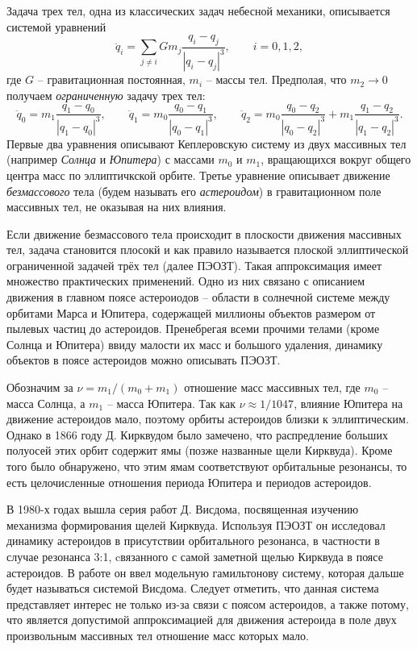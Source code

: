 Задача трех тел, одна из классических задач небесной механики, описывается системой уравнений
$$\ddot q_i = \sum_{j \neq i} G m_j \frac{q_i-q_j}{|q_i-q_j|^3}, \qquad i = 0,1,2,$$
где $G$ -- гравитационная постоянная, $m_i$ -- массы тел.
Предполая, что $m_2 \to 0$ получаем \textit{ограниченную} задачу трех тел:
$$\ddot q_0 = m_1 \frac{q_1-q_0}{|q_1-q_0|^3}, \qquad \ddot q_1 = m_0 \frac{q_0-q_1}{|q_0-q_1|^3}, \qquad \ddot q_2 = m_0 \frac{q_0-q_2}{|q_0-q_2|^3} + m_1 \frac{q_1-q_2}{|q_1-q_2|^3}.$$
Первые два уравнения описывают Кеплеровскую систему из двух массивных тел (например \textit{Солнца} и \textit{Юпитера}) с массами $m_0$ и $m_1$, вращающихся вокруг общего центра масс по эллиптичкской орбите. Третье уравнение описывает движение \textit{безмассового} тела (будем называть его \textit{астероидом}) в гравитационном поле массивных тел, не оказывая на них влияния.

Если движение безмассового тела происходит в плоскости движения массивных тел, задача становится плосокй и как правило называется плоской эллиптической ограниченной задачей трёх тел (далее ПЭОЗТ). Такая аппроксимация имеет множество практических применений. Одно из них связано с описанием движения в главном поясе астероиодов -- области в солнечной системе между орбитами Марса и Юпитера, содержащей миллионы объектов размером от пылевых частиц до астероидов. Пренебрегая всеми прочими телами (кроме Солнца и Юпитера) ввиду малости их масс и большого удаления, динамику объектов в поясе  астероидов можно описывать ПЭОЗТ.

Обозначим за $\nu = m_1/(m_0+m_1)$ отношение масс массивных тел, где $m_0$ -- масса Солнца, а $m_1$ -- масса Юпитера. Так как $\nu \approx 1/1047$, влияние Юпитера на движение астероидов мало, поэтому орбиты астероидов близки к эллиптическим. Однако в 1866 году Д. Кирквудом было замечено, что распредление больших полуосей этих орбит содержит ямы (позже названные щели Кирквуда). Кроме того было обнаружено, что этим ямам соответствуют орбитальные резонансы, то есть целочисленные отношения периода Юпитера и периодов астероидов.

В 1980-х годах вышла серия работ Д. Висдома, посвященная изучению механизма формирования щелей Кирквуда. Используя ПЭОЗТ он исследовал динамику астероидов в присутствии орбитального резонанса, в частности в случае резонанса 3:1, cвязанного с самой заметной щелью Кирквуда в поясе астероидов.
В работе \cite{wis1} он ввел модельную гамильтонову систему, которая дальше будет называться системой Висдома. 
Следует отметить, что данная система представляет интерес не только из-за связи с поясом астероидов, а также потому, что является допустимой аппроксимацией для движения астероида в поле двух произвольным массивных тел отношение масс которых мало.

